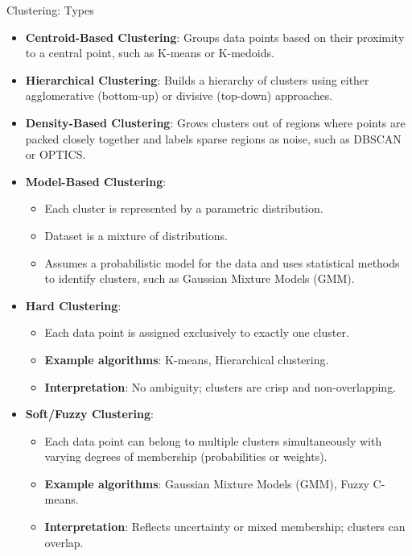 \begin{frame}[allowframebreaks]{Clustering: Types}
    \begin{itemize}
        \item \textbf{Centroid-Based Clustering}: Groups data points based on their proximity to a central point, such as K-means or K-medoids.
        \item \textbf{Hierarchical Clustering}: Builds a hierarchy of clusters using either agglomerative (bottom-up) or divisive (top-down) approaches.
        \item \textbf{Density-Based Clustering}: Grows clusters out of regions where points are packed closely together and labels sparse regions as noise, such as DBSCAN or OPTICS.
        \item \textbf{Model-Based Clustering}:
        \begin{itemize}
            \item Each cluster is represented by a parametric distribution.
            \item Dataset is a mixture of distributions.
            \item Assumes a probabilistic model for the data and uses statistical methods to identify clusters, such as Gaussian Mixture Models (GMM).
        \end{itemize}
        \item \textbf{Hard Clustering}: 
        \begin{itemize}
            \item Each data point is assigned exclusively to exactly one cluster.
            \item \textbf{Example algorithms}: K-means, Hierarchical clustering.
            \item \textbf{Interpretation}: No ambiguity; clusters are crisp and non-overlapping.
        \end{itemize}
        \item \textbf{Soft/Fuzzy Clustering}: 
        \begin{itemize}
            \item Each data point can belong to multiple clusters simultaneously with varying degrees of membership (probabilities or weights).
            \item \textbf{Example algorithms}: Gaussian Mixture Models (GMM), Fuzzy C-means.
            \item \textbf{Interpretation}: Reflects uncertainty or mixed membership; clusters can overlap.
        \end{itemize}
    \end{itemize}
\end{frame}



